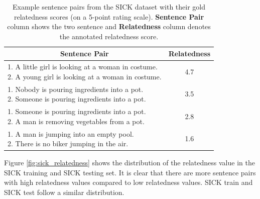 \begin{enumerate}
  \begin{table}[ht!]
  	\centering 	
  	\begin{tabular}{l|c} 
  		\hline
  		\multicolumn{1}{c|}{\textbf{Sentence Pair}} & 
  		\multicolumn{1}{c}{\textbf{Relatedness}}  \\
  		\hline
  		\makecell[l]
  		{1. A little girl is looking at a woman in costume. \\ 
  		 2. A young girl is looking at a woman in costume.} & 4.7  \\
  		\hline
  			\makecell[l]
  		{1. Nobody is pouring ingredients into a pot. \\ 
  			2. Someone is pouring ingredients into a pot. } & 3.5  \\
  		\hline
  		\makecell[l]
  		{1. Someone is pouring ingredients into a pot. \\ 
  		 2. A man is removing vegetables from a pot. } & 2.8  \\
  		\hline
  		\makecell[l]
  		{1. A man is jumping into an empty pool. \\ 
  		 2. There is no biker jumping in the air. } & 1.6  \\
  		\hline               
  	\end{tabular}
  	\caption[Example sentence pairs from the SICK dataset]{Example sentence pairs from the SICK dataset with their gold relatedness scores (on a 5-point rating scale). \textbf{Sentence Pair} column shows the two sentence and \textbf{Relatedness} column denotes the annotated relatedness score.}
  	\label{tab:sickdata}
  \end{table}

Figure \ref{fig:sick_relatedness} shows the distribution of the relatedness value in the SICK training and SICK testing set. It is clear that there are more sentence pairs with high relatedness values compared to low relatedness values. SICK train and SICK test follow a similar distribution. 



\end{enumerate}
